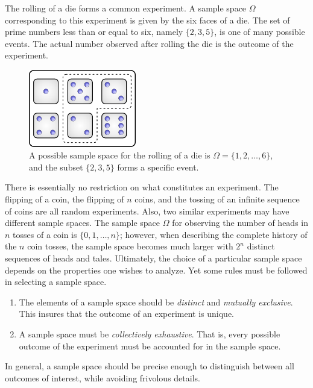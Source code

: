 \begin{example}
The rolling of a die forms a common experiment.
A sample space $\Omega$ corresponding to this experiment is given by the six faces of a die.
The set of prime numbers less than or equal to six, namely $\{ 2, 3, 5 \}$, is one of many possible events.
The actual number observed after rolling the die is the outcome of the experiment.

\begin{figure}[htb!]
\begin{center}
\includegraphics[height=3.38cm]{Figures/2Chapter/dices}
\caption{A possible sample space for the rolling of a die is $\Omega = \{ 1, 2, \ldots, 6 \}$, and the subset $\{2, 3, 5 \}$ forms a specific event.}
\end{center}
\end{figure}
\end{example}

There is essentially no restriction on what constitutes an experiment.
The flipping of a coin, the flipping of $n$ coins, and the tossing of an infinite sequence of coins are all random experiments.
Also, two similar experiments may have different sample spaces.
The sample space $\Omega$ for observing the number of heads in $n$ tosses of a coin is $\{ 0, 1, \ldots, n \}$; however, when describing the complete history of the $n$ coin tosses, the sample space becomes much larger with $2^n$ distinct sequences of heads and tales.
Ultimately, the choice of a particular sample space depends on the properties one wishes to analyze.
Yet some rules must be followed in selecting a sample space.
\begin{enumerate}
\item The elements of a sample space should be \emph{distinct} and \emph{mutually exclusive}.
This insures that the outcome of an experiment is unique.
\item A sample space must be \emph{collectively exhaustive}.
That is, every possible outcome of the experiment must be accounted for in the sample space.
\end{enumerate}
In general, a sample space should be precise enough to distinguish between all outcomes of interest, while avoiding frivolous details.


